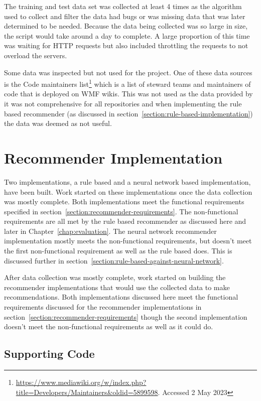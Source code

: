 The training and test data set was collected at least 4 times as the algorithm used to collect and filter the data had bugs or was missing data that was later determined to be needed. Because the data being collected was so large in size, the script would take around a day to complete. A large proportion of this time was waiting for HTTP requests but also included throttling the requests to not overload the servers.

\label{para:data-inspected-but-not-used}Some data was inspected but not used for the project. One of these data sources is the Code maintainers list\footnote{\url{https://www.mediawiki.org/w/index.php?title=Developers/Maintainers&oldid=5899598}. Accessed 2 May 2023} which is a list of steward teams and maintainers of code that is deployed on WMF wikis. This was not used as the data provided by it was not comprehensive for all repositories and when implementing the rule based recommender (as discussed in section~\ref{section:rule-based-implementation}) the data was deemed as not useful.

\section{Recommender Implementation}

Two implementations, a rule based and a neural network based implementation, have been built. Work started on these implementations once the data collection was mostly complete. Both implementations meet the functional requirements specified in section~\ref{section:recommender-requirements}. The non-functional requirements are all met by the rule based recommender as discussed here and later in Chapter~\ref{chap:evaluation}. The neural network recommender implementation mostly meets the non-functional requirements, but doesn't meet the first non-functional requirement as well as the rule based does. This is discussed further in section~\ref{section:rule-based-against-neural-network}.

After data collection was mostly complete, work started on building the recommender implementations that would use the collected data to make recommendations.  Both implementations discussed here meet the functional requirements discussed for the recommender implementations in section~\ref{section:recommender-requirements} though the second implementation doesn't meet the non-functional requirements as well as it could do.

\subsection{Supporting Code\label{section:supporting-code}}

